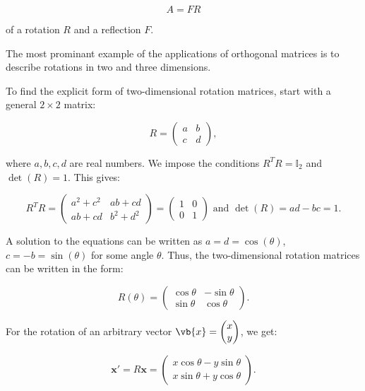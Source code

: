 \documentclass[a4paper,12pt]{report}
\begin{document}
\begin{equation}
    A = FR
\end{equation}

of a rotation \(R\) and a reflection \(F\). 

The most prominant example of the applications of orthogonal matrices is to describe rotations in two and three dimensions. 

To find the explicit form of two-dimensional rotation matrices, start with a general \(2 \times 2\) matrix:

\begin{equation}
R = \begin{pmatrix} a & b \\ c & d \end{pmatrix},
\end{equation}

where \(a, b, c, d\) are real numbers. We impose the conditions \(R^T R = \mathbb{I}_2\) and \(\det(R) = 1\). This gives:

\begin{equation}
R^T R = \begin{pmatrix} a^2 + c^2 & ab + cd \\ ab + cd & b^2 + d^2 \end{pmatrix} = \begin{pmatrix} 1 & 0 \\ 0 & 1 \end{pmatrix} \text { and } 
\det(R) = ad - bc = 1.
\end{equation}

A solution to the equations can be written as \(a = d = \cos(\theta)\), \(c = -b = \sin(\theta)\) for some angle \(\theta\). Thus, the two-dimensional rotation matrices can be written in the form:

\begin{equation}
R(\theta) = \begin{pmatrix} \cos \theta & -\sin \theta \\ \sin \theta & \cos \theta \end{pmatrix}.
\end{equation}

For the rotation of an arbitrary vector \(\vb{x} = \begin{pmatrix}
     x \\
     y \\
\end{pmatrix}\), we get:

\begin{equation}
\mathbf{x}' = R\mathbf{x} = \begin{pmatrix} x \cos \theta - y \sin \theta \\ x \sin \theta + y \cos \theta \end{pmatrix}.
\end{equation}
\end{document}
